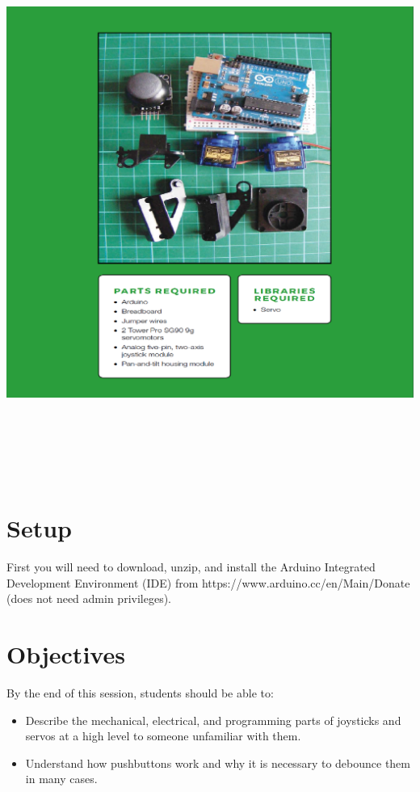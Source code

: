 \documentclass{article}
\begin{document}
\begin{center}
\includegraphics[width=\textwidth, height=18cm]{requir.png}
\end{center}

\section{Setup}
First you will need to download, unzip, and install the Arduino Integrated Development Environment
(IDE) from https://www.arduino.cc/en/Main/Donate (does not need admin privileges).

\section{Objectives}
By the end of this session, students should be able to:

\begin{itemize}
\item Describe the mechanical, electrical, and programming parts of joysticks and servos at a high
  level to someone unfamiliar with them.
\item Understand how pushbuttons work and why it is necessary to debounce them in many cases.
\end{itemize}
\end{document}
